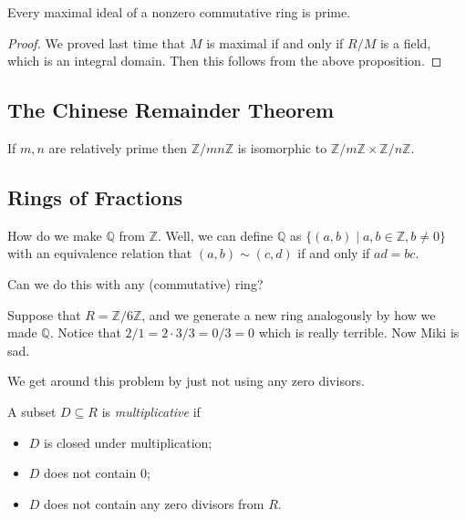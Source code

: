\begin{proposition}
Every maximal ideal of a nonzero commutative ring is prime.
\end{proposition}

\begin{proof}
We proved last time that $M$ is maximal if and only if $R/M$ is a field, which is an integral domain. Then this follows from the above proposition.
\end{proof}

\subsection{The Chinese Remainder Theorem}

\begin{theorem}
If $m,n$ are relatively prime then $\mathbb{Z}/mn\mathbb{Z}$ is isomorphic to $\mathbb{Z}/m\mathbb{Z} \times \mathbb{Z}/n\mathbb{Z}$.
\end{theorem}

\subsection{Rings of Fractions}

How do we make $\mathbb{Q}$ from $\mathbb{Z}$. Well, we can define $\mathbb{Q}$ as $\{(a,b) \mid a,b \in \mathbb{Z}, b \not= 0\}$ with an equivalence relation that $(a,b) \sim (c,d)$ if and only if $ad = bc$.

Can we do this with any (commutative) ring?

\begin{example}
Suppose that $R = \mathbb{Z}/6\mathbb{Z}$, and we generate a new ring analogously by how we made $\mathbb{Q}$. Notice that $2/1 = 2 \cdot 3 / 3 = 0 / 3 = 0$ which is really terrible. Now Miki is sad.
\end{example}

We get around this problem by just not using any zero divisors.

\begin{definition}
A subset $D \subseteq R$ is \emph{multiplicative} if 
\begin{itemize}
\item $D$ is closed under multiplication;
\item $D$ does not contain $0$;
\item $D$ does not contain any zero divisors from $R$.
\end{itemize}
\end{definition}

